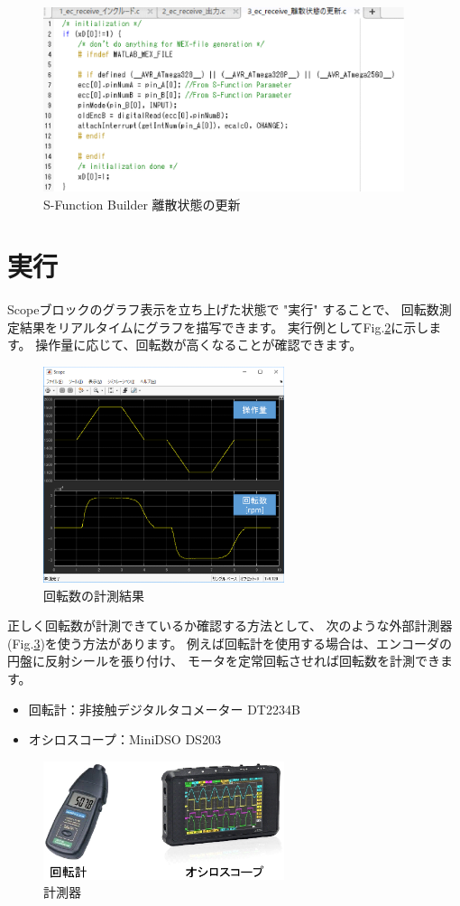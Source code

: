 \begin{figure}[htbp]
    \centering
    \includegraphics[width=300pt]{fig/fig310.eps}
    \caption{S-Function Builder 離散状態の更新}
    \label{fig310}
\end{figure}  


\clearpage
\section{実行}\label{ux811aux69cbux6210}

Scopeブロックのグラフ表示を立ち上げた状態で "実行" することで、
回転数測定結果をリアルタイムにグラフを描写できます。
実行例としてFig.\ref{fig311}に示します。
操作量に応じて、回転数が高くなることが確認できます。
\begin{figure}[htbp]
    \centering
    \includegraphics[width=200pt]{fig/fig311.eps}
    \caption{回転数の計測結果}
    \label{fig311}
\end{figure}

正しく回転数が計測できているか確認する方法として、
次のような外部計測器(Fig.\ref{fig312})を使う方法があります。
例えば回転計を使用する場合は、エンコーダの円盤に反射シールを張り付け、
モータを定常回転させれば回転数を計測できます。

\begin{itemize}
    \tightlist
    \item
    回転計：非接触デジタルタコメーター DT2234B
    \item
    オシロスコープ：MiniDSO DS203
    \end{itemize}

\begin{figure}[htbp]
    \centering
    \includegraphics[width=200pt]{fig/fig312.eps}
    \caption{計測器}
    \label{fig312}
\end{figure}